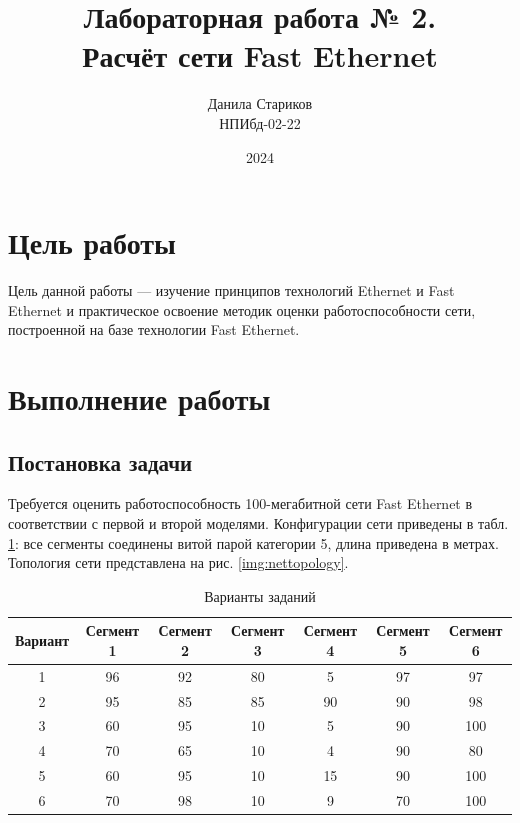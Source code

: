 
\usepackage[table]{xcolor}
\usepackage{array}
\usepackage{multirow}

\title{Лабораторная работа № 2. \\ Расчёт сети Fast Ethernet}
\author{Данила Стариков \\ НПИбд-02-22}
\date{2024}



\maketitle
\newpage

\tableofcontents

\newpage
\section{Цель работы}
Цель данной работы — изучение принципов технологий Ethernet и Fast Ethernet
и практическое освоение методик оценки работоспособности сети, построенной
на базе технологии Fast Ethernet.

\newpage
\section{Выполнение работы}
\subsection{Постановка задачи}
Требуется оценить работоспособность 100-мегабитной сети Fast Ethernet в соответствии
с первой и второй моделями. Конфигурации сети приведены в табл. \ref{tab:netconfig}:
все сегменты соединены витой парой категории 5, длина приведена в метрах.
Топология сети представлена на рис. \ref{img:nettopology}.

\begin{table}[!ht]
    \caption{Варианты заданий}
    \label{tab:netconfig}
    \centering
    \begin{tabular}{|c|c|c|c|c|c|c|}
    \hline
        Вариант & Сегмент 1 & Сегмент 2 & Сегмент 3 & Сегмент 4 & Сегмент 5 & Сегмент 6 \\ \hline
        1 & 96 & 92 & 80 & 5 & 97 & 97 \\ \hline
        2 & 95 & 85 & 85 & 90 & 90 & 98 \\ \hline
        3 & 60 & 95 & 10 & 5 & 90 & 100 \\ \hline
        4 & 70 & 65 & 10 & 4 & 90 & 80 \\ \hline
        5 & 60 & 95 & 10 & 15 & 90 & 100 \\ \hline
        6 & 70 & 98 & 10 & 9 & 70 & 100 \\ \hline
    \end{tabular}
\end{table}

